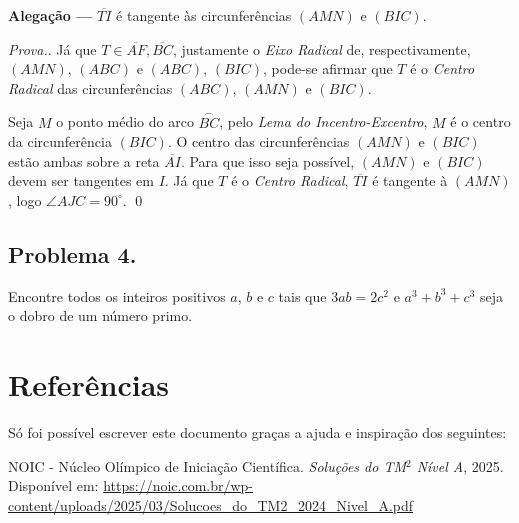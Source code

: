 \documentclass[12pt]{article}
\begin{document}
      \begin{tcolorbox}[claimbox={Claim}]
        \textbf{\sffamily\textcolor{color1}{Alegação ---}} $\overline{TI}$ é tangente às circunferências
        $(AMN)$ e $(BIC)$.
      \end{tcolorbox}

      \textit{Prova.}. Já que $T \in \overline{AF}, \overline{BC}$, justamente o \textit{Eixo Radical}
      de, respectivamente, $(AMN)$, $(ABC)$ e $(ABC)$, $(BIC)$, pode-se afirmar que $T$ é o \textit{Centro
      Radical} das circunferências $(ABC)$, $(AMN)$ e $(BIC)$.

      Seja $M$ o ponto médio do arco $\overset{\frown}{BC}$, pelo \textit{Lema do Incentro-Excentro}, $M$
      é o centro da circunferência $(BIC)$. O centro das circunferências $(AMN)$ e $(BIC)$ estão ambas sobre
      a reta $\overline{AI}$. Para que isso seja possível, $(AMN)$ e $(BIC)$ devem ser tangentes em $I$. Já
      que $T$ é o \textit{Centro Radical}, $\overline{TI}$ é tangente à $(AMN)$, logo $\angle AJC = 90^{\circ}$. \qed

      \clearpage
    
    \subsection{Problema 4.}
      \begin{tcolorbox}[problembox={Enunciado do problema}]
        Encontre todos os inteiros positivos $a$, $b$ e $c$ tais que $3ab = 2c^2$
        e $ a^3 + b^3 + c^3$ seja o dobro de um número primo.
      \end{tcolorbox}

  \clearpage
  
  \section{\textsf{Referências}}
  Só foi possível escrever este documento graças a ajuda e inspiração dos seguintes:

  \renewcommand{\refname}{\vspace{-2em}}
  \begin{thebibliography}{9}
    NOIC - Núcleo Olímpico de Iniciação Científica.
    \textit{Soluções do TM$^2$ Nível A}, 2025.
    Disponível em: \url{https://noic.com.br/wp-content/uploads/2025/03/Solucoes_do_TM2_2024_Nivel_A.pdf}
  \end{thebibliography}
\end{document}
